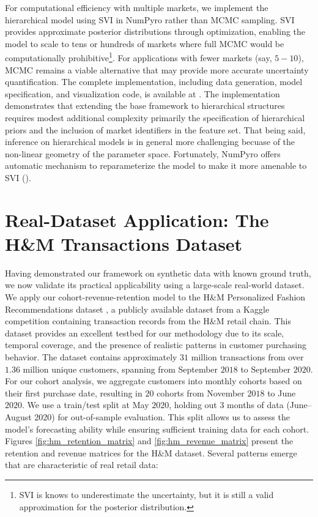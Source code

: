 \documentclass[11pt]{amsart}
\theoremstyle{definition}
\begin{document}
For computational efficiency with multiple markets, we implement the hierarchical model using SVI in NumPyro rather than MCMC sampling.
SVI provides approximate posterior distributions through optimization, enabling the model to scale to tens or hundreds of markets
where full MCMC would be computationally prohibitive\footnote{
    SVI is knows to underestimate the uncertainty, but it is still a valid approximation for the posterior distribution.
}. For applications with fewer markets (say, $5-10$), MCMC remains a viable
alternative that may provide more accurate uncertainty quantification. The complete implementation, including data generation,
model specification, and visualization code, is available at \cite{orduz_hierarchical_revenue_retention}.
The implementation demonstrates that extending the base framework to hierarchical structures requires modest additional
complexity primarily the specification of hierarchical priors and the inclusion of market
identifiers in the feature set. That being said, inference on hierarchical models is in general more challenging becuase of the
non-linear geometry of the parameter space. Fortunately, NumPyro offers automatic mechanism to reparameterize the model
to make it more amenable to SVI (\cite{gorinova2020automatic}).

\section{Real-Dataset Application: The H\&M Transactions Dataset}\label{sec:hm_application}

Having demonstrated our framework on synthetic data with known ground truth, we now validate its practical applicability
using a large-scale real-world dataset.
We apply our cohort-revenue-retention model to the H\&M Personalized Fashion Recommendations dataset \cite{hm_kaggle2022},
a publicly available dataset from a Kaggle competition containing transaction records from the H\&M retail chain.
This dataset provides an excellent testbed for our methodology due to its scale, temporal coverage, and the presence
of realistic patterns in customer purchasing behavior.
The dataset contains approximately $31$ million transactions from over $1.36$ million unique customers, spanning
from September $2018$ to September $2020$. For our cohort analysis, we aggregate customers into monthly cohorts based
on their first purchase date, resulting in $20$ cohorts from November $2018$ to June $2020$. We use a train/test split
at May $2020$, holding out $3$ months of data (June--August 2020) for out-of-sample evaluation. This split allows us
to assess the model's forecasting ability while ensuring sufficient training data for each cohort.
Figures \ref{fig:hm_retention_matrix} and \ref{fig:hm_revenue_matrix} present the retention and revenue matrices
for the H\&M dataset. Several patterns emerge that are characteristic of real retail data:
\end{document}
